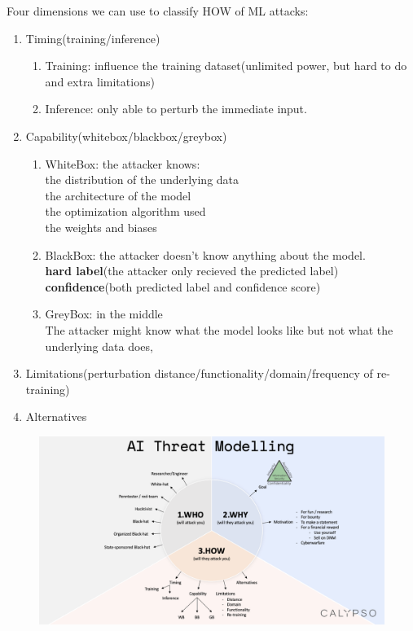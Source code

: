 \documentclass[11pt]{article}
\numberwithin{equation}{section}
\begin{document}
\colorbox{orange!15}{Four dimensions we can use to classify HOW of ML attacks:}

\begin{enumerate}
    \item Timing(training/inference)
    \begin{enumerate}
        \item Training: influence the training dataset(unlimited power, but hard to do and extra limitations)
        \item Inference: only able to perturb the immediate input.
    \end{enumerate}
    \item Capability(whitebox/blackbox/greybox)
    \begin{enumerate}
        \item WhiteBox: the attacker knows:\\
        the distribution of the underlying data\\
        the architecture of the model\\
        the optimization algorithm used\\
        the weights and biases
        \item BlackBox: the attacker doesn't know anything about the model.\\
        \textbf{hard label}(the attacker only recieved the predicted label)\\
        \textbf{confidence}(both predicted label and confidence score)
        \item GreyBox: in the middle\\
        The attacker might know what the model looks like but not what the underlying data does,
    \end{enumerate}
    \item Limitations(perturbation distance/functionality/domain/frequency of re-training)
    \item Alternatives
\end{enumerate}

\begin{figure}[!h]
	\centering
	\includegraphics[width=16cm]{figures/pie_all.png}
	\label{fig:pie_all}
\end{figure}
\end{document}
